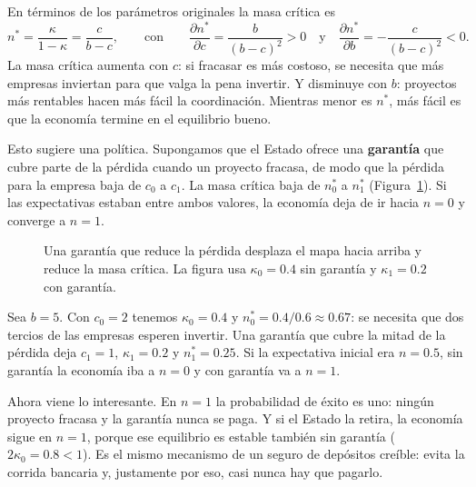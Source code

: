 \documentclass[12pt,letterpaper]{article}
\newcommand{\pkap}{0.2}      %
\newcommand{\pkapalt}{0.4}   %
\begin{document}
En términos de los parámetros originales la masa crítica es
\[
  n^*=\frac{\kappa}{1-\kappa}=\frac{c}{b-c},
  \qquad\text{con}\qquad
  \frac{\partial n^*}{\partial c}=\frac{b}{(b-c)^{2}}>0
  \quad\text{y}\quad
  \frac{\partial n^*}{\partial b}=-\frac{c}{(b-c)^{2}}<0 .
\]
La masa crítica aumenta con $c$: si fracasar es más costoso, se necesita que más empresas inviertan para que valga la pena invertir. Y disminuye con $b$: proyectos más rentables hacen más fácil la coordinación. Mientras menor es $n^*$, más fácil es que la economía termine en el equilibrio bueno.

Esto sugiere una política. Supongamos que el Estado ofrece una \textbf{garantía} que cubre parte de la pérdida cuando un proyecto fracasa, de modo que la pérdida para la empresa baja de $c_0$ a $c_1$. La masa crítica baja de $n_0^*$ a $n_1^*$ (Figura~\ref{fig:politica}). Si las expectativas estaban entre ambos valores, la economía deja de ir hacia $n=0$ y converge a $n=1$.

\begin{figure}[htb]
\centering
{}
\caption{Una garantía que reduce la pérdida desplaza el mapa hacia arriba y reduce la masa crítica. La figura usa $\kappa_0=0.4$ sin garantía y $\kappa_1=0.2$ con garantía.}
\label{fig:politica}
\end{figure}

\begin{intuicion}
Sea $b=5$. Con $c_0=2$ tenemos $\kappa_0=0.4$ y $n_0^*=0.4/0.6\approx0.67$: se necesita que dos tercios de las empresas esperen invertir. Una garantía que cubre la mitad de la pérdida deja $c_1=1$, $\kappa_1=0.2$ y $n_1^*=0.25$. Si la expectativa inicial era $n=0.5$, sin garantía la economía iba a $n=0$ y con garantía va a $n=1$.

Ahora viene lo interesante. En $n=1$ la probabilidad de éxito es uno: ningún proyecto fracasa y la garantía nunca se paga. Y si el Estado la retira, la economía sigue en $n=1$, porque ese equilibrio es estable también sin garantía ($2\kappa_0=0.8<1$). Es el mismo mecanismo de un seguro de depósitos creíble: evita la corrida bancaria y, justamente por eso, casi nunca hay que pagarlo.
\end{intuicion}
\end{document}

